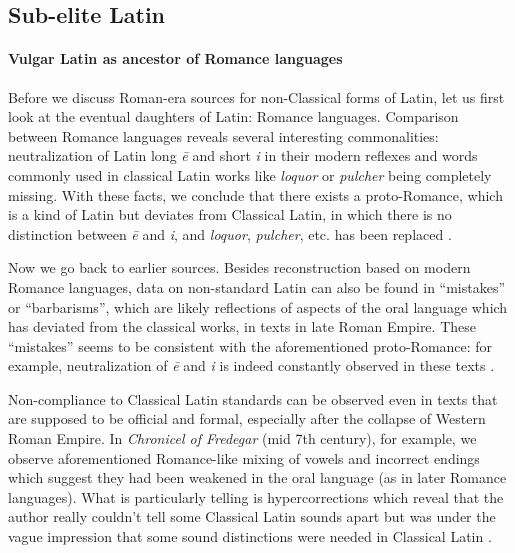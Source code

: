 \documentclass[a4paper, oneside, 12pt]{report}
\newcommand*{\citepage}[1]{p.~{#1}}
\newcommand*{\citepages}[1]{pp.~{#1}}
\newcommand{\form}[1]{\emph{#1}}
\newcommand{\literature}[1]{\textit{#1}}
\begin{document}
\subsection{Sub-elite Latin}\label{sec:introduction.history.sub-elite}

\paragraph*{Vulgar Latin as ancestor of Romance languages}
\label{sec:introduction.history.sub-elite.proto-romance}
Before we discuss Roman-era sources for non-Classical forms of Latin,
let us first look at the eventual daughters of Latin: Romance languages.
Comparison between Romance languages reveals several interesting commonalities:
neutralization of Latin long \form{\={e}} and short \form{i}
in their modern reflexes
and words commonly used in classical Latin works like \form{loquor} or \form{pulcher}
being completely missing.
With these facts, we conclude that there exists a proto-Romance,
which is a kind of Latin but deviates from Classical Latin,
in which there is no distinction between \form{\={e}} and \form{i}, 
and \form{loquor}, \form{pulcher}, etc. has been replaced
\citep[\citepages{1-3}]{herman2010vulgar}.

Now we go back to earlier sources.
Besides reconstruction based on modern Romance languages,
data on non-standard Latin can also be found in
``mistakes'' or ``barbarisms'', 
which are likely reflections of aspects of the oral language 
which has deviated from the classical works, 
in texts in late Roman Empire.
These ``mistakes'' seems to be consistent with the aforementioned proto-Romance:
for example, neutralization of \form{\={e}} and \form{i} is indeed constantly observed in these texts
\citep[\citepage{4}]{herman2010vulgar}.

Non-compliance to Classical Latin standards can be observed even in texts
that are supposed to be official and formal,
especially after the collapse of Western Roman Empire.
In \literature{Chronicel of Fredegar} (mid 7th century), for example, we observe
aforementioned Romance-like mixing of vowels
and incorrect endings which suggest they had been weakened in the oral language
(as in later Romance languages).
What is particularly telling is hypercorrections
which reveal that the author really couldn't tell some Classical Latin sounds apart
but was under the vague impression that
some sound distinctions were needed in Classical Latin
\citep[\citepages{158-159}]{leonhardt2013latin}.
\end{document}
